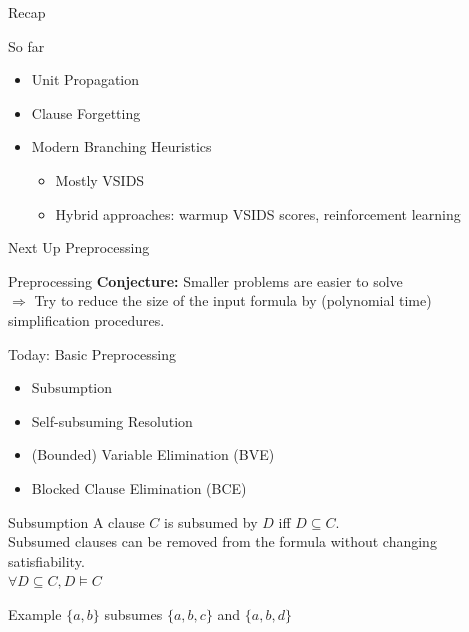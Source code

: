 \documentclass[t]{sdqbeamer}
\begin{document}
\begin{frame}{Recap}
    \begin{block}{So far}
        \begin{itemize}
            \item Unit Propagation
            \item Clause Forgetting
            \item Modern Branching Heuristics
            \begin{itemize}
                \item Mostly VSIDS
                \item Hybrid approaches: warmup VSIDS scores, reinforcement learning
            \end{itemize}
        \end{itemize}
    \end{block}
    \begin{block}{Next Up}
        Preprocessing
    \end{block}
\end{frame}
    
\begin{frame}{Preprocessing}
\textbf{Conjecture:} Smaller problems are easier to solve\\[1ex]
$\Longrightarrow$ Try to reduce the size of the input formula by (polynomial time) simplification procedures.\\[1em]
\begin{block}{Today: Basic Preprocessing}
\begin{itemize}\setlength{\itemsep}{1ex}
    \item Subsumption
    \item Self-subsuming Resolution
    \item (Bounded) Variable Elimination (BVE)
    \item Blocked Clause Elimination (BCE)
\end{itemize}
\end{block}
\end{frame}
    
    
\begin{frame}{Subsumption}
A clause $C$ is subsumed by $D$ iff $D \subseteq C$.\\[1ex]
Subsumed clauses can be removed from the formula without changing satisfiability.\\[1ex]
$\forall D \subseteq C, D \models C$\\[1em]
\begin{exampleblock}{Example}
    $\{a, b\}$ subsumes $\{a, b, c\}$ and $\{a, b, d\}$
\end{exampleblock}
\end{frame}
    
\end{document}
